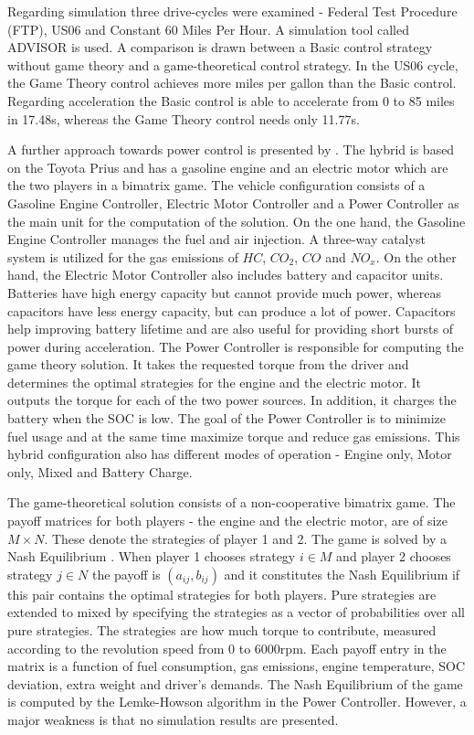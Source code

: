 Regarding simulation three drive-cycles were examined - Federal Test Procedure (FTP), US06 and Constant 60 Miles Per Hour. A simulation tool called ADVISOR \citep{burch1999advisor} is used. A comparison is drawn between a Basic control strategy without game theory and a game-theoretical control strategy. In the US06 cycle, the Game Theory control achieves more miles per gallon than the Basic control. Regarding acceleration the Basic control is able to accelerate from 0 to 85 miles in 17.48s, whereas the Game Theory control needs only 11.77s.


A further approach towards power control is presented by \citet{chin2010design}. The hybrid is based on the Toyota Prius and has a gasoline engine and an electric motor which are the two players in a bimatrix game. The vehicle configuration consists of a Gasoline Engine Controller, Electric Motor Controller and a Power Controller as the main unit for the computation of the solution. On the one hand, the Gasoline Engine Controller manages the fuel and air injection. A three-way catalyst system is utilized for the gas emissions of $HC$, $CO_2$, $CO$ and $NO_x$. On the other hand, the Electric Motor Controller also includes battery and capacitor units. Batteries have high energy capacity but cannot provide much power, whereas capacitors have less energy capacity, but can produce a lot of power. Capacitors help improving battery lifetime and are also useful for providing short bursts of power during acceleration. The Power Controller is responsible for computing the game theory solution. It takes the requested torque from the driver and determines the optimal strategies for the engine and the electric motor. It outputs the torque for each of the two power sources. In addition, it charges the battery when the SOC is low. The goal of the Power Controller is to minimize fuel usage and at the same time maximize torque and reduce gas emissions. This hybrid configuration also has different modes of operation - Engine only, Motor only, Mixed and Battery Charge.

The game-theoretical solution consists of a non-cooperative bimatrix game. The payoff matrices for both players - the engine and the electric motor, are of size $M \times N$. These denote the strategies of player 1 and 2. The game is solved by a Nash Equilibrium \citep{nash1951non}. When player 1 chooses strategy $i \in M$ and player 2 chooses strategy $j \in N$ the payoff is $(a_{ij},b_{ij})$ and it constitutes the Nash Equilibrium if this pair contains the optimal strategies for both players. Pure strategies are extended to mixed by specifying the strategies as a vector of probabilities over all pure strategies. The strategies are how much torque to contribute, measured according to the revolution speed from 0 to 6000rpm. Each payoff entry in the matrix is a function of fuel consumption, gas emissions, engine temperature, SOC deviation, extra weight and driver's demands. The Nash Equilibrium of the game is computed by the Lemke-Howson algorithm \citep{lemke1964equilibrium} in the Power Controller. However, a major weakness is that no simulation results are presented.

